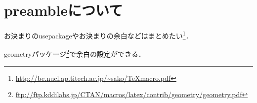 \section{preambleについて}\label{sec:no3}
お決まりのusepackageやお決まりの余白などはまとめたい\footnote{\url{http://be.nucl.ap.titech.ac.jp/~sako/TeXmacro.pdf}}．

geometryパッケージ\footnote{\url{ftp://ftp.kddilabs.jp/CTAN/macros/latex/contrib/geometry/geometry.pdf}}で余白の設定ができる．

\layout
